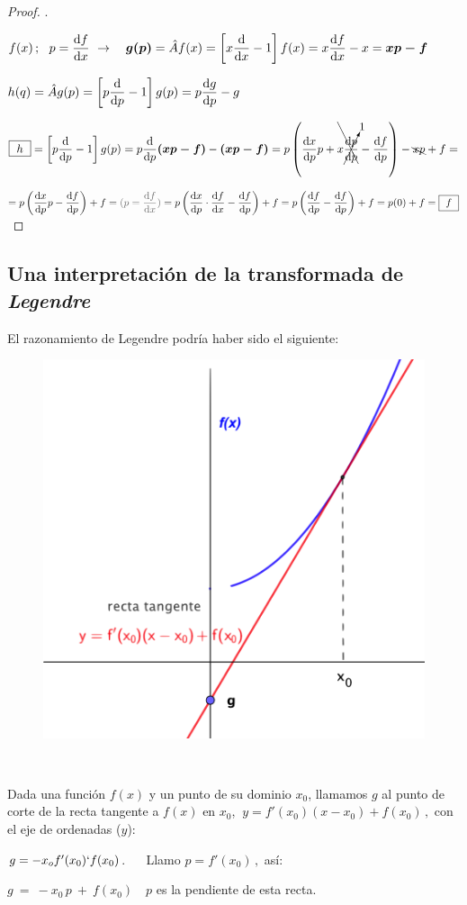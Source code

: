 \begin{proof}.
	
\vspace{2mm}	$f(x) \, ; \ \ p=\displaystyle \dv{f}{x} \ \to 	\quad \boldsymbol{g(p)}=\hat A f(x)= \left[x\dv{x}-1\right] f(x)=x\dv{f}{x}-x=\boldsymbol{xp-f}$

\vspace{2mm} $\displaystyle h(q)=\hat A g(p)= \left[p\dv{p}-1\right] g(p) = p\dv{g}{p}-g $

\vspace{2mm} $ \displaystyle \boxed{ \ \displaystyle{h} \ }= \left[p\dv{p}-1\right] g(p)=p\dv{p} \boldsymbol{(xp-f)}- \boldsymbol{(xp-f)}=p\left( \dv{x}{p} p + \bcancel{x \cancelto{1}{\dv{p}{p}}} - \dv{f}{p} \right) - \bcancel{xp} + f=$

$\displaystyle = p \left( \dv{x}{p} p  -\dv{f}{p} \right) + f=\textcolor{gris}{(p=\dv{f}{x})}  =p \left( \dv{x}{p} \cdot \dv{f}{x} - \dv{f}{p} \right) + f = p \left(\dv{f}{p}-\dv{f}{p} \right)+f=p (0) + f =\boxed{ \ \displaystyle{f} \ }$

\end{proof}

\subsection{Una interpretación de la transformada de \emph{Legendre}}
\vspace{0.5cm}

El razonamiento de Legendre podría haber sido el siguiente:

\begin{multicols}{2}
\begin{figure}[H]
	\centering
	\includegraphics[width=.4\textwidth]{imagenes/img11-01.png}
\end{figure}
$\quad$

Dada una función $f(x)$ y un punto de su dominio $x_0$, llamamos $g$ al punto de corte de la recta tangente a $f(x)$ en $x_0$, $\ y=f'(x_0)(x-x_0)+f(x_0)\, ,$ con el eje de ordenadas ($y$):

$g=-x_of'(x_0)`f(x_0)$. $\quad$ Llamo $p=f'(x_0)\, , $ así:

$g \ = \ -x_0 \, p \ + \ f(x_0) \quad p$ es la pendiente de esta recta.
\end{multicols}


